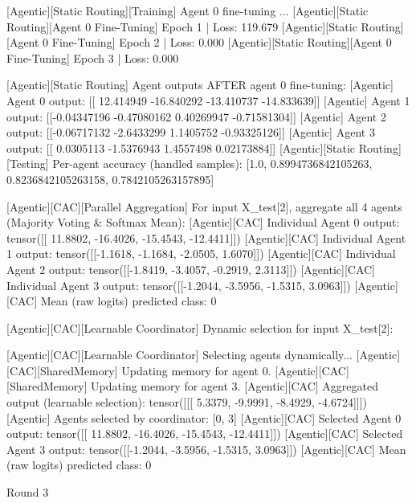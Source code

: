 [Agentic][Static Routing][Training] Agent 0 fine-tuning ...
[Agentic][Static Routing][Agent 0 Fine-Tuning] Epoch 1 | Loss: 119.679
[Agentic][Static Routing][Agent 0 Fine-Tuning] Epoch 2 | Loss: 0.000
[Agentic][Static Routing][Agent 0 Fine-Tuning] Epoch 3 | Loss: 0.000

[Agentic][Static Routing] Agent outputs AFTER agent 0 fine-tuning:
[Agentic] Agent 0 output: [[ 12.414949 -16.840292 -13.410737 -14.833639]]
[Agentic] Agent 1 output: [[-0.04347196 -0.47080162  0.40269947 -0.71581304]]
[Agentic] Agent 2 output: [[-0.06717132 -2.6433299   1.1405752  -0.93325126]]
[Agentic] Agent 3 output: [[ 0.0305113  -1.5376943   1.4557498   0.02173884]]
[Agentic][Static Routing][Testing] Per-agent accuracy (handled samples): [1.0, 0.8994736842105263, 0.8236842105263158, 0.7842105263157895]

[Agentic][CAC][Parallel Aggregation] For input X_test[2], aggregate all 4 agents (Majority Voting & Softmax Mean):
[Agentic][CAC] Individual Agent 0 output: tensor([[ 11.8802, -16.4026, -15.4543, -12.4411]])
[Agentic][CAC] Individual Agent 1 output: tensor([[-1.1618, -1.1684, -2.0505,  1.6070]])
[Agentic][CAC] Individual Agent 2 output: tensor([[-1.8419, -3.4057, -0.2919,  2.3113]])
[Agentic][CAC] Individual Agent 3 output: tensor([[-1.2044, -3.5956, -1.5315,  3.0963]])
[Agentic][CAC] Mean (raw logits) predicted class: 0

[Agentic][CAC][Learnable Coordinator] Dynamic selection for input X_test[2]:

[Agentic][CAC][Learnable Coordinator] Selecting agents dynamically...
[Agentic][CAC][SharedMemory] Updating memory for agent 0.
[Agentic][CAC][SharedMemory] Updating memory for agent 3.
[Agentic][CAC] Aggregated output (learnable selection): tensor([[[ 5.3379, -9.9991, -8.4929, -4.6724]]])
[Agentic] Agents selected by coordinator: [0, 3]
[Agentic][CAC] Selected Agent 0 output: tensor([[ 11.8802, -16.4026, -15.4543, -12.4411]])
[Agentic][CAC] Selected Agent 3 output: tensor([[-1.2044, -3.5956, -1.5315,  3.0963]])
[Agentic][CAC] Mean (raw logits) predicted class: 0

Round 3


